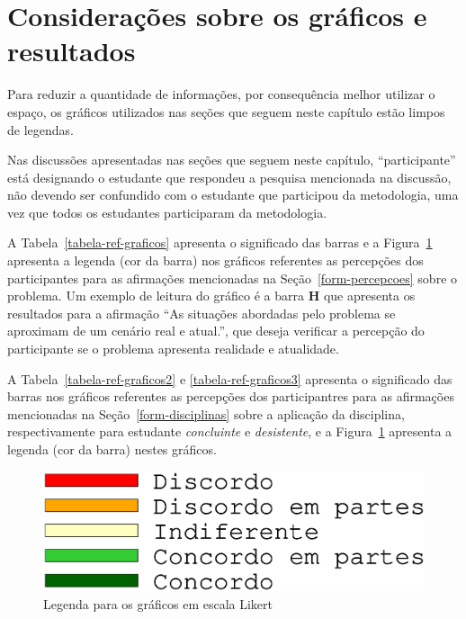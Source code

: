 \section{Considerações sobre os gráficos e resultados}
\label{sec-ref-graficos}
Para reduzir a quantidade de informações, por consequência melhor utilizar o
espaço, os gráficos utilizados nas seções que seguem neste capítulo
estão limpos de legendas.

Nas discussões apresentadas nas seções que seguem neste capítulo,
``participante'' está designando o estudante que respondeu a
pesquisa mencionada na discussão, não devendo ser confundido com
o estudante que participou da metodologia, uma vez que todos
os estudantes participaram da metodologia.


A Tabela~\ref{tabela-ref-graficos} apresenta o significado das barras
e a Figura~\ref{figura-ref-graficos} apresenta a legenda (cor da barra)
nos gráficos referentes as percepções dos participantes para as
afirmações mencionadas na Seção~\ref{form-percepcoes} sobre
o problema.
Um exemplo de leitura do gráfico é a barra \textbf{H} que apresenta
os resultados para a afirmação ``As situações abordadas pelo problema
se aproximam de um cenário real e atual.'', que deseja verificar
a percepção do participante se o problema apresenta realidade
e atualidade.



A Tabela~\ref{tabela-ref-graficos2} e \ref{tabela-ref-graficos3} apresenta
o significado das barras nos gráficos referentes as percepções
dos participantres para as afirmações mencionadas
na Seção~\ref{form-disciplinas} sobre a aplicação da disciplina,
respectivamente para estudante \textit{concluinte} e \textit{desistente},
e a Figura~\ref{figura-ref-graficos} apresenta a legenda (cor da barra)
nestes gráficos.

\begin{figure}[!htb]
\centering
\includegraphics[scale=0.3,trim={0 4cm 0 1.5cm},clip]{figura-ref-graficos.eps}
\caption{Legenda para os gráficos em escala Likert} 
\label{figura-ref-graficos}
\end{figure}

